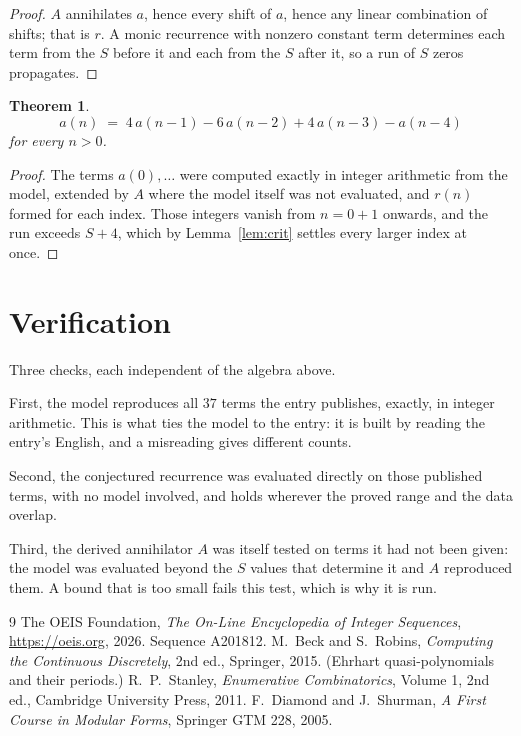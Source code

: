 \documentclass[11pt,a4paper]{article}
\theoremstyle{plain}
\newtheorem{theorem}{Theorem}
\theoremstyle{definition}
\begin{document}
\begin{proof}
$A$ annihilates $a$, hence every shift of $a$, hence any linear combination of shifts; that is
$r$. A monic recurrence with nonzero constant term determines each term from the $S$ before it
and each from the $S$ after it, so a run of $S$ zeros propagates.
\end{proof}

\begin{theorem}
\[
a(n)\;=\;4\,a(n-1) - 6\,a(n-2) + 4\,a(n-3) - a(n-4)
\]
for every $n>0$.
\end{theorem}

\begin{proof}
The terms $a(0),\dots$ were computed exactly in integer arithmetic from the model, extended by
$A$ where the model itself was not evaluated, and $r(n)$ formed for each index. Those integers
vanish from $n=0+1$ onwards, and the run exceeds $S+4$, which by
Lemma~\ref{lem:crit} settles every larger index at once.
\end{proof}

\section{Verification}

Three checks, each independent of the algebra above.

First, the model reproduces all $37$ terms the entry publishes, exactly, in integer
arithmetic. This is what ties the model to the entry: it is built by reading the entry's
English, and a misreading gives different counts.

Second, the conjectured recurrence was evaluated directly on those published terms, with no
model involved, and holds wherever the proved range and the data overlap.

Third, the derived annihilator $A$ was itself tested on terms it had not been given: the model
was evaluated beyond the $S$ values that determine it and $A$ reproduced them. A bound that is
too small fails this test, which is why it is run.

\begin{thebibliography}{9}
 The OEIS Foundation, \emph{The On-Line Encyclopedia of Integer
Sequences}, \url{https://oeis.org}, 2026. Sequence A201812.
 M.~Beck and S.~Robins, \emph{Computing the Continuous Discretely},
2nd ed., Springer, 2015. (Ehrhart quasi-polynomials and their periods.)
 R.~P.~Stanley, \emph{Enumerative Combinatorics}, Volume 1, 2nd ed.,
Cambridge University Press, 2011.
 F.~Diamond and J.~Shurman, \emph{A First Course in Modular Forms},
Springer GTM 228, 2005.
\end{thebibliography}
\end{document}
